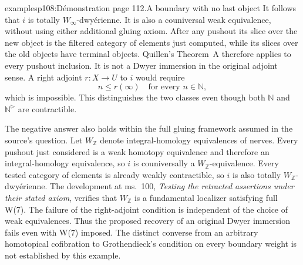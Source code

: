 \begin{dcomment}{examples}{p108:Démonstration page 112.}{A boundary with no last object}
It follows that $i$ is totally $W_\infty$-dwyérienne. It is also a couniversal weak equivalence, without using either additional gluing axiom. After any pushout its slice over the new object is the filtered category of elements just computed, while its slices over the old objects have terminal objects. Quillen's Theorem~A therefore applies to every pushout inclusion. It is not a Dwyer immersion in the original adjoint sense. A right adjoint $r:X\to U$ to $i$ would require
\[
 n\leq r(\infty)\quad\text{for every }n\in\mathbb N,
\]
which is impossible. This distinguishes the two classes even though both $\mathbb N$ and $\mathbb N^\triangleright$ are contractible.

The negative answer also holds within the full gluing framework assumed in the source's question. Let $W_{\mathbb Z}$ denote integral-homology equivalences of nerves. Every pushout just considered is a weak homotopy equivalence and therefore an integral-homology equivalence, so $i$ is couniversally a $W_{\mathbb Z}$-equivalence. Every tested category of elements is already weakly contractible, so $i$ is also totally $W_{\mathbb Z}$-dwyérienne. The development at ms.~100, \emph{Testing the retracted assertions under their stated axiom}, verifies that $W_{\mathbb Z}$ is a fundamental localizer satisfying full W(7). The failure of the right-adjoint condition is independent of the choice of weak equivalences. Thus the proposed recovery of an original Dwyer immersion fails even with W(7) imposed. The distinct converse from an arbitrary homotopical cofibration to Grothendieck's condition on every boundary weight is not established by this example.
\end{dcomment}

